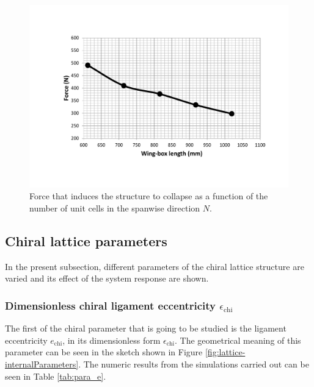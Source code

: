     \begin{figure}[!htpb] %
      \centering
      \includegraphics[width=0.8 \textwidth]{../figures/result-sim/N/force_N}
      \caption[Force that induces the structure to collapse as a function of the number of unit cells in the spanwise direction]{Force that induces the structure to collapse as a function of the number of unit cells in the spanwise direction $N$.}\label{fig:force_N}
    \end{figure}

  \clearpage
  \subsection{Chiral lattice parameters} \label{subsec:chiral_para}

    In the present subsection, different parameters of the chiral lattice structure are varied and its effect of the system response are shown.

    \subsubsection{Dimensionless chiral ligament eccentricity $\epsilon_{\mathrm{chi}}$}

      The first of the chiral parameter that is going to be studied is the ligament eccentricity $e_{\mathrm{chi}}$, in its dimensionless form $\epsilon_{\mathrm{chi}}$. The geometrical meaning of this parameter can be seen in the sketch shown in Figure \ref{fig:lattice-internalParameters}. The numeric results from the simulations carried out can be seen in Table \ref{tab:para_e}.

